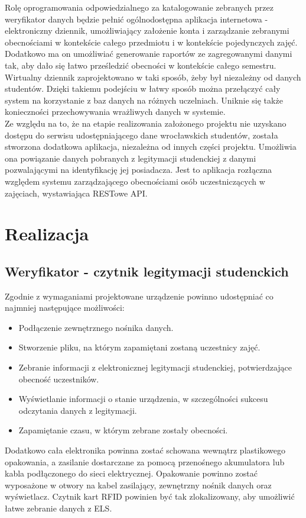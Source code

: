 \documentclass[declaration,shortabstract, mgr]{iithesis}
\begin{document}
\indent Rolę oprogramowania odpowiedzialnego za katalogowanie zebranych przez weryfikator danych będzie pełnić ogólnodostępna aplikacja internetowa - elektroniczny dziennik, umożliwiający założenie konta i zarządzanie zebranymi obecnościami w kontekście całego przedmiotu i w kontekście pojedynczych zajęć. Dodatkowo ma on umożliwiać generowanie raportów ze zagregowanymi danymi tak, aby dało się łatwo prześledzić obecności w kontekście całego semestru. \\
\indent Wirtualny dziennik zaprojektowano w taki sposób, żeby był niezależny od danych studentów. Dzięki takiemu podejściu w łatwy sposób można przełączyć cały system na korzystanie z baz danych na różnych uczelniach. Uniknie się także konieczności przechowywania wrażliwych danych w systemie. \\
\indent Ze względu na to, że na etapie realizowania założonego projektu nie uzyskano dostępu do serwisu udostępniającego dane wrocławskich studentów, została stworzona dodatkowa aplikacja, niezależna od innych części projektu. Umożliwia ona powiązanie danych pobranych z legitymacji studenckiej z danymi pozwalającymi na identyfikację jej posiadacza. Jest to aplikacja rozłączna względem systemu zarządzającego obecnościami osób uczestniczących w zajęciach, wystawiająca RESTowe API.

\chapter{Realizacja}
\section{Weryfikator - czytnik legitymacji studenckich}
\indent Zgodnie z wymaganiami projektowane urządzenie powinno udostępniać co najmniej następujące możliwości:
\begin{itemize}
\item Podłączenie zewnętrznego nośnika danych.
\item Stworzenie pliku, na którym zapamiętani zostaną uczestnicy zajęć.
\item Zebranie informacji z elektronicznej legitymacji studenckiej, potwierdzające obecność uczestników.
\item Wyświetlanie informacji o stanie urządzenia, w szczególności sukcesu odczytania danych z legitymacji.
\item Zapamiętanie czasu, w którym zebrane zostały obecności.
\end{itemize}
\indent Dodatkowo cała elektronika powinna zostać schowana wewnątrz plastikowego opakowania, a zasilanie dostarczane za pomocą przenośnego akumulatora lub kabla podłączonego do sieci elektrycznej. Opakowanie powinno zostać wyposażone w otwory na kabel zasilający, zewnętrzny nośnik danych oraz wyświetlacz. Czytnik kart RFID powinien być tak zlokalizowany, aby umożliwić łatwe zebranie danych z ELS.
\end{document}
